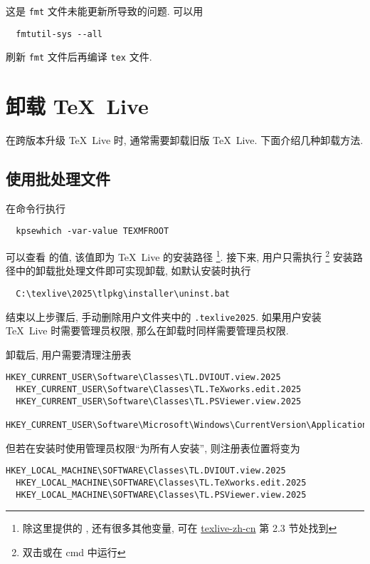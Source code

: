 这是 \texttt{fmt} 文件未能更新所导致的问题.
可以用
\begin{lstlisting}
  fmtutil-sys --all
\end{lstlisting}
刷新 \texttt{fmt} 文件后再编译 \texttt{tex} 文件.

\section{卸载 \TeX~Live}

在跨版本升级 \TeX~Live 时, 通常需要卸载旧版 \TeX~Live.
下面介绍几种卸载方法.

\subsection{使用批处理文件}

在命令行执行
\begin{lstlisting}
  kpsewhich -var-value TEXMFROOT
\end{lstlisting}
可以查看  的值,
该值即为 \TeX~Live 的安装路径%
\footnote{%
  除这里提供的 , 还有很多其他变量, 可在
  \href{https://www.tug.org/texlive/doc/texlive-zh-cn/texlive-zh-cn.pdf}{texlive-zh-cn}
  第 2.3 节处找到
}. 
接下来,
用户只需执行%
\footnote{双击或在 \textsf{cmd} 中运行}%
安装路径中的卸载批处理文件即可实现卸载, 如默认安装时执行
\begin{lstlisting}
  C:\texlive\2025\tlpkg\installer\uninst.bat
\end{lstlisting}
结束以上步骤后,
手动删除用户文件夹中的 \texttt{.texlive2025}.
如果用户安装 \TeX~Live 时需要管理员权限,
那么在卸载时同样需要管理员权限.

卸载后,
用户需要清理注册表
\begin{lstlisting}[language = {}]
  HKEY_CURRENT_USER\Software\Classes\TL.DVIOUT.view.2025
  HKEY_CURRENT_USER\Software\Classes\TL.TeXworks.edit.2025
  HKEY_CURRENT_USER\Software\Classes\TL.PSViewer.view.2025
  HKEY_CURRENT_USER\Software\Microsoft\Windows\CurrentVersion\ApplicationAssociationToasts\TL.TeXworks.edit.2025_.tex
\end{lstlisting}
但若在安装时使用管理员权限``为所有人安装'',
则注册表位置将变为
\begin{lstlisting}[language = {}]
  HKEY_LOCAL_MACHINE\SOFTWARE\Classes\TL.DVIOUT.view.2025
  HKEY_LOCAL_MACHINE\SOFTWARE\Classes\TL.TeXworks.edit.2025
  HKEY_LOCAL_MACHINE\SOFTWARE\Classes\TL.PSViewer.view.2025
\end{lstlisting}

